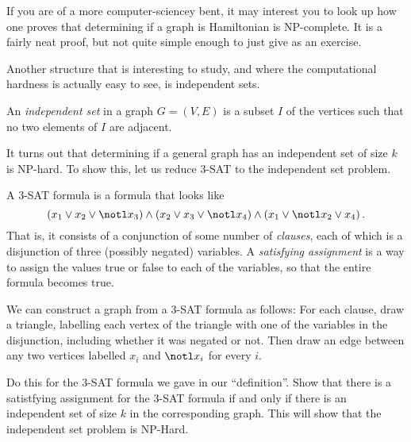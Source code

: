 \documentclass[nobib]{tufte-handout}
\begin{document}
If you are of a more computer-sciencey bent, it may interest you to look up how one proves that determining if a graph is Hamiltonian is NP-complete. It is a fairly neat proof, but not quite simple enough to just give as an exercise.

Another structure that is interesting to study, and where the computational hardness is actually easy to see, is independent sets.

\begin{definition}
  An \emph{independent set} in a graph $G = (V,E)$ is a subset $I$ of the vertices such that no two elements of $I$ are adjacent.
\end{definition}

It turns out that determining if a general graph has an independent set of size $k$ is NP-hard. To show this, let us reduce $3$-SAT to the independent set problem.

\begin{definition}
  A $3$-SAT formula is a formula that looks like
  $$\left(x_1 \vee x_2 \vee \notl x_3\right) \wedge \left(x_2 \vee x_3 \vee \notl x_4\right) \wedge \left(x_1 \vee \notl x_2 \vee x_4\right).$$
  That is, it consists of a conjunction of some number of \emph{clauses}, each of which is a disjunction of three (possibly negated) variables. A \emph{satisfying assignment} is a way to assign the values true or false to each of the variables, so that the entire formula becomes true.
\end{definition}

\begin{xca}
  We can construct a graph from a $3$-SAT formula as follows: For each clause, draw a triangle, labelling each vertex of the triangle with one of the variables in the disjunction, including whether it was negated or not. Then draw an edge between any two vertices labelled $x_i$ and $\notl x_i$ for every $i$.

  Do this for the $3$-SAT formula we gave in our ``definition''. Show that there is a satistfying assignment for the $3$-SAT formula if and only if there is an independent set of size $k$ in the corresponding graph. This will show that the independent set problem is NP-Hard.
\end{xca}

%
%
\end{document}
